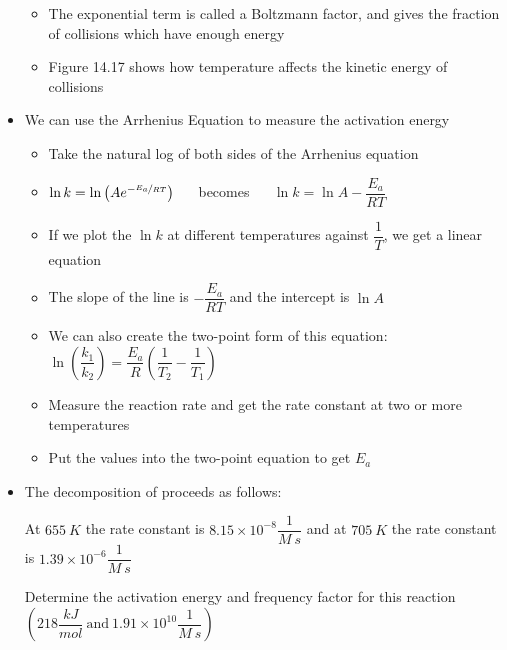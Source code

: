 \documentclass[12pt, openany, letterpaper]{memoir}
\begin{document}
\begin{itemize}
\begin{itemize}
		\item The exponential term is called a Boltzmann factor, and gives the fraction of collisions which have enough energy
		\item Figure 14.17 shows how temperature affects the kinetic energy of collisions
	\end{itemize}
	\item We can use the Arrhenius Equation to measure the activation energy
	\begin{itemize}
		\item Take the natural log of both sides of the Arrhenius equation
		\item $\ln k=\ln\left(Ae^{-\nicefrac{E_a}{RT}}\right)$ ~~ becomes ~~ $\ln k = \ln A - \dfrac{E_a}{RT}$
		\item If we plot the $\ln k$ at different temperatures against $\dfrac{1}{T}$, we get a linear equation
		\item The slope of the line is $-\dfrac{E_a}{RT}$ and the intercept is $\ln A$
		\item We can also create the two-point form of this equation: $\ln\left(\dfrac{k_1}{k_2}\right)=\dfrac{E_a}{R}\left(\dfrac{1}{T_2}-\dfrac{1}{T_1}\right)$
		\item Measure the reaction rate and get the rate constant at two or more temperatures
		\item Put the values into the two-point equation to get $E_a$		
	\end{itemize}
	\item The decomposition of  proceeds as follows: 
	
	At $655~K$ the rate constant is $8.15\times10^{-8}\dfrac{1}{M~s}$ and at $705~K$ the rate constant is $1.39\times10^{-6}\dfrac{1}{M~s}$
	
	Determine the activation energy and frequency factor for this reaction $\left(218\dfrac{kJ}{mol}~\mathrm{and}~1.91\times10^{10}\dfrac{1}{M~s}\right)$
\end{itemize}
\end{document}
